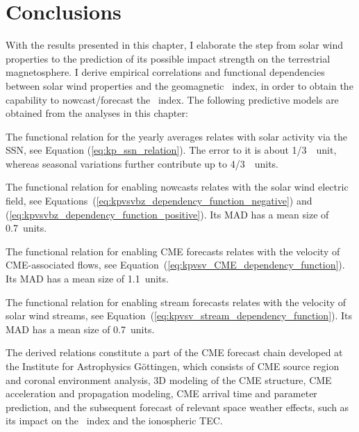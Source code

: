 

\section{Conclusions}
\label{sec:conclusions_ch2}
With the results presented in this chapter, I elaborate the step from solar wind properties to the prediction of its possible impact strength on the terrestrial magnetosphere. I derive empirical correlations and functional dependencies between solar wind properties and the geomagnetic \Kp~index, in order to obtain the capability to nowcast/forecast the \Kp~index. The following predictive models are obtained from the \Kp{} analyses in this chapter:
\begin{itemize*}
	\item The functional relation for the yearly \Kp{} averages relates \Kp{} with solar activity via the SSN, see Equation (\ref{eq:kp_ssn_relation}). The error to it is about 1/3~\Kp{}~unit, whereas seasonal variations further contribute up to 4/3~\Kp{}~units.
	\item The functional relation for enabling \Kp{} nowcasts relates \Kp{} with the solar wind electric field, see Equations~(\ref{eq:kpvsvbz_dependency_function_negative}) and (\ref{eq:kpvsvbz_dependency_function_positive}). Its MAD has a mean size of \SI{0.7}{\Kp}~units.
	\item The functional relation for enabling CME forecasts relates \Kp{} with the velocity of CME-associated flows, see Equation~(\ref{eq:kpvsv_CME_dependency_function}). Its MAD has a mean size of \SI{1.1}{\Kp}~units.
	\item The functional relation for enabling stream forecasts relates \Kp{} with the velocity of solar wind streams, see Equation~(\ref{eq:kpvsv_stream_dependency_function}). Its MAD has a mean size of \SI{0.7}{\Kp}~units.
\end{itemize*}

The derived \Kp{} relations constitute a part of the CME forecast chain developed at the Institute for Astrophysics Göttingen, which consists of CME source region and coronal environment analysis, 3D modeling of the CME structure, CME acceleration and propagation modeling, CME arrival time and parameter prediction, and the subsequent forecast of relevant space weather effects, such as its impact on the \Kp~index and the ionospheric TEC.

